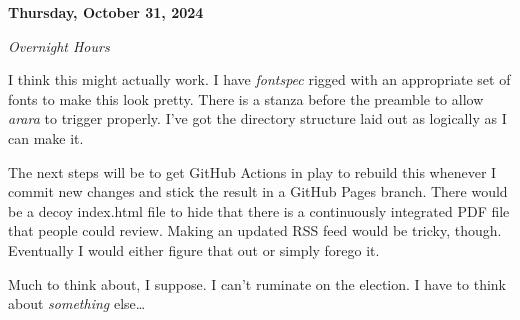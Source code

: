 \textbf{Thursday, October 31, 2024}

\emph{Overnight Hours}

I think this might actually work. I have \emph{fontspec} rigged with an
appropriate set of fonts to make this look pretty. There is a stanza
before the preamble to allow \emph{arara} to trigger properly. I've got
the directory structure laid out as logically as I can make it.

The next steps will be to get GitHub Actions in play to rebuild this
whenever I commit new changes and stick the result in a GitHub Pages
branch. There would be a decoy index.html file to hide that there is a
continuously integrated PDF file that people could review. Making an
updated RSS feed would be tricky, though. Eventually I would either
figure that out or simply forego it.

Much to think about, I suppose. I can't ruminate on the election. I have
to think about \emph{something} else\ldots{}
